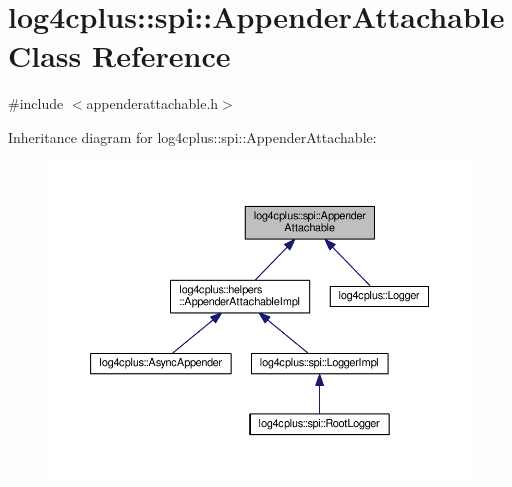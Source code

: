 \hypertarget{classlog4cplus_1_1spi_1_1AppenderAttachable}{\section{log4cplus\-:\-:spi\-:\-:Appender\-Attachable Class Reference}
\label{classlog4cplus_1_1spi_1_1AppenderAttachable}
}


{\ttfamily \#include $<$appenderattachable.\-h$>$}



Inheritance diagram for log4cplus\-:\-:spi\-:\-:Appender\-Attachable\-:
\nopagebreak
\begin{figure}[H]
\begin{center}
\leavevmode
\includegraphics[width=350pt]{classlog4cplus_1_1spi_1_1AppenderAttachable__inherit__graph}
\end{center}
\end{figure}
